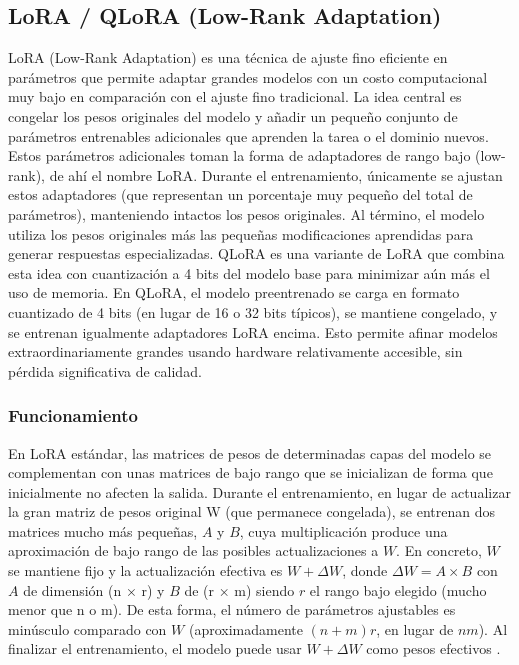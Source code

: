\subsection{LoRA / QLoRA (Low-Rank Adaptation)}

LoRA (Low-Rank Adaptation) es una técnica de ajuste fino eficiente en parámetros que permite adaptar grandes modelos con un costo computacional muy bajo en comparación con el ajuste fino tradicional. La idea central es congelar los pesos originales del modelo y añadir un pequeño conjunto de parámetros entrenables adicionales que aprenden la tarea o el dominio nuevos. Estos parámetros adicionales toman la forma de adaptadores de rango bajo (low-rank), de ahí el nombre LoRA. Durante el entrenamiento, únicamente se ajustan estos adaptadores (que representan un porcentaje muy pequeño del total de parámetros), manteniendo intactos los pesos originales. Al término, el modelo utiliza los pesos originales más las pequeñas modificaciones aprendidas para generar respuestas especializadas. QLoRA es una variante de LoRA que combina esta idea con cuantización a 4 bits del modelo base para minimizar aún más el uso de memoria. En QLoRA, el modelo preentrenado se carga en formato cuantizado de 4 bits (en lugar de 16 o 32 bits típicos), se mantiene congelado, y se entrenan igualmente adaptadores LoRA encima. Esto permite afinar modelos extraordinariamente grandes usando hardware relativamente accesible, sin pérdida significativa de calidad.\cite{CloudFlare-LoRA}

\subsubsection{Funcionamiento}

En LoRA estándar, las matrices de pesos de determinadas capas del modelo  se complementan con unas matrices de bajo rango que se inicializan de forma que inicialmente no afecten la salida. Durante el entrenamiento, en lugar de actualizar la gran matriz de pesos original W (que permanece congelada), se entrenan dos matrices mucho más pequeñas, $A$ y $B$, cuya multiplicación produce una aproximación de bajo rango de las posibles actualizaciones a $W$. En concreto, $W$ se mantiene fijo y la actualización efectiva es $W + \Delta W$, donde $\Delta W = A \times B$ con $A$ de dimensión (n × r) y $B$ de (r × m) siendo $r$ el rango bajo elegido (mucho menor que n o m). De esta forma, el número de parámetros ajustables es minúsculo comparado con $W$ (aproximadamente $(n+m)r$, en lugar de $nm$). Al finalizar el entrenamiento, el modelo puede usar $W + \Delta W$ como pesos efectivos \cite{CloudFlare-LoRA}.

